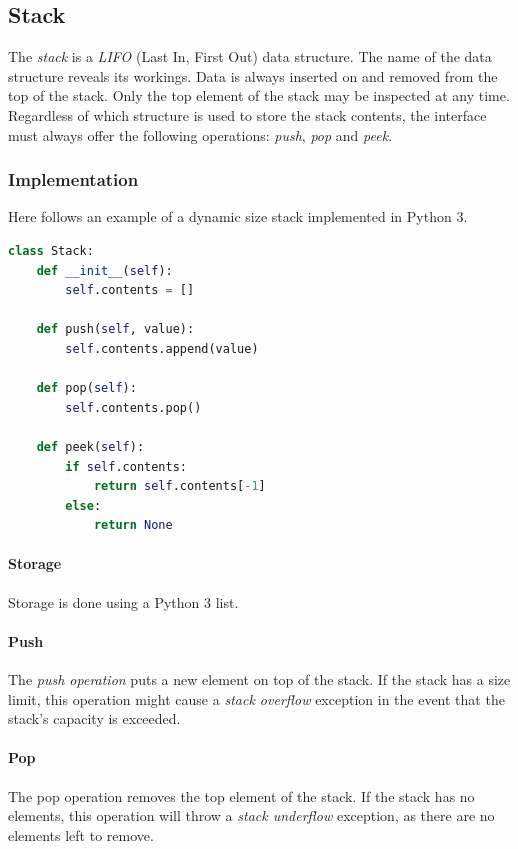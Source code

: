 \documentclass{article}
\begin{document}
\subsection{Stack}
The {\em stack} is a {\em LIFO} (Last In, First Out) data structure.
The name of the data structure reveals its workings.
Data is always inserted on and removed from the top of the stack.
Only the top element of the stack may be inspected at any time.
Regardless of which structure is used to store the stack contents,
the interface must always offer the following operations: {\em push}, {\em pop} and {\em peek}.

\subsubsection{Implementation}
Here follows an example of a dynamic size stack implemented in Python 3.

\begin{lstlisting}[language=Python]
  class Stack:
    def __init__(self):
        self.contents = []

    def push(self, value):
        self.contents.append(value)

    def pop(self):
        self.contents.pop()

    def peek(self):
        if self.contents:
            return self.contents[-1]
        else:
            return None
\end{lstlisting}

\paragraph{Storage}
Storage is done using a Python 3 list.

\paragraph{Push}
The {\em push operation} puts a new element on top of the stack.
If the stack has a size limit, this operation might cause a {\em stack overflow} exception in the event that the stack's capacity is exceeded.

\paragraph{Pop}
The pop operation removes the top element of the stack. If the stack has no elements, this operation will throw a {\em stack underflow} exception,
as there are no elements left to remove.
\end{document}
